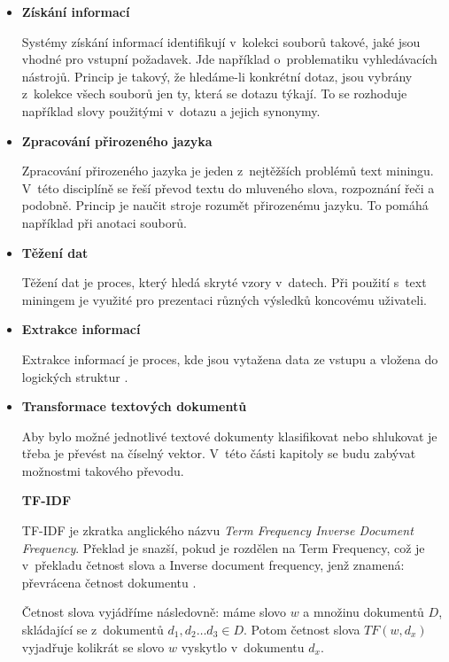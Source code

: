 \documentclass[thesis=M,czech]{FITthesis}[2012/10/20]
\begin{document}
		\begin{itemize} 

		\item \textbf{Získání informací}
		
			Systémy získání informací identifikují v~kolekci souborů takové, jaké jsou vhodné pro vstupní požadavek. Jde například o~problematiku vyhledávacích nástrojů. Princip je takový, že hledáme-li konkrétní dotaz, jsou vybrány z~kolekce všech souborů jen ty, která se dotazu týkají. To se rozhoduje například slovy použitými v~dotazu a jejich synonymy.
		
		\item \textbf{Zpracování přirozeného jazyka}
		
			Zpracování přirozeného jazyka je jeden z~nejtěžších problémů text miningu. V~této disciplíně se řeší převod textu do mluveného slova, rozpoznání řeči a podobně. Princip je naučit stroje rozumět přirozenému jazyku. To pomáhá například při anotaci souborů.
			
		\item \textbf{Těžení dat}
		
			Těžení dat je proces, který hledá skryté vzory v~datech. Při použití s~text miningem je využité pro prezentaci různých výsledků koncovému uživateli.
			
		\item \textbf{Extrakce informací}
		
			Extrakce informací je proces, kde jsou vytažena data ze vstupu a vložena do logických struktur \cite{SankarSureshTextMining}.
		
		
		\item \textbf{Transformace textových dokumentů}
		
		 Aby bylo možné jednotlivé textové dokumenty klasifikovat nebo shlukovat je třeba je převést na číselný vektor. V~této části kapitoly se budu zabývat možnostmi takového převodu.
	
		\textbf{TF-IDF}
			\label{subsub:tf-idf}
			
			TF-IDF je zkratka anglického názvu \textit{Term Frequency Inverse Document Frequency}. Překlad je snazší, pokud je rozdělen na Term Frequency, což je v~překladu četnost slova a Inverse document frequency, jenž znamená: převrácena četnost dokumentu \cite{RamosTF-IDF}.
			
			Četnost slova vyjádříme následovně: máme slovo $w$ a množinu dokumentů $D$, skládající se z~dokumentů $d_1, d_2 \ldots d_3 \in D$. Potom četnost slova $TF(w, d_x)$ vyjadřuje kolikrát se slovo $w$ vyskytlo v~dokumentu $d_x$.
			

\end{itemize}
\end{document}
